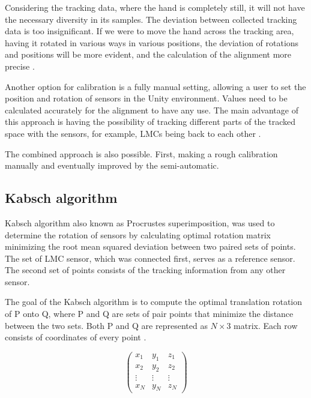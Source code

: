 Considering the tracking data, where the hand is completely still, it will not have the necessary diversity in its samples. The deviation between collected tracking data is too insignificant. If we were to move the hand across the tracking area, having it rotated in various ways in various positions, the deviation of rotations and positions will be more evident, and the calculation of the alignment more precise \cite{tomasMultileap}.

Another option for calibration is a fully manual setting, allowing a user to set the position and rotation of sensors in the Unity environment. Values need to be calculated accurately for the alignment to have any use. The main advantage of this approach is having the possibility of tracking different parts of the tracked space with the sensors, for example, LMCs being back to each other \cite{tomasMultileap}.

The combined approach is also possible. First, making a rough calibration manually and eventually improved by the semi-automatic.

\subsection{Kabsch algorithm}

Kabsch algorithm \cite{kabsch} also known as Procrustes superimposition, was used to determine the rotation of sensors by calculating optimal rotation matrix minimizing the root mean squared deviation between two paired sets of points. The set of LMC sensor, which was connected first, serves as a reference sensor. The second set of points consists of the tracking information from any other sensor. \cite{tomasMultileap}

The goal of the Kabsch algorithm is to compute the optimal translation rotation of P onto Q, where P and Q are sets of pair points that minimize the distance between the two sets. Both P and Q are represented as $N \times 3$ matrix. Each row consists of coordinates of every point \cite{tomasMultileap}.

\begin{equation}
    \begin{pmatrix}
        x_1 & y_1 & z_1\\
        x_2 & y_2 & z_2\\
        \vdots & \vdots & \vdots\\
        x_N & y_N & z_N
    \end{pmatrix}
\end{equation}

